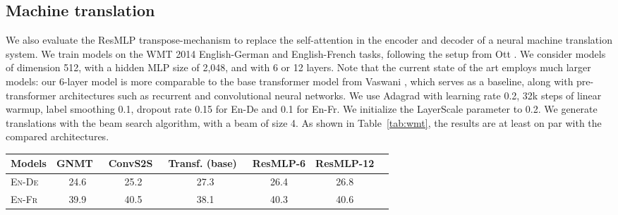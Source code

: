 \subsection{Machine translation}



We also evaluate the ResMLP transpose-mechanism to replace the self-attention in the encoder and decoder of a neural machine translation system.
We train models on the WMT 2014 English-German and English-French tasks, following the setup from Ott \etal \cite{ott2018scaling}.
We consider models of dimension 512, with a hidden MLP size of 2,048, and with 6 or 12 layers. Note that the current state of the art employs much larger models: our 6-layer model is more comparable to the base transformer model from Vaswani \etal \cite{vaswani2017attention}, which serves as a baseline, along with pre-transformer architectures such as recurrent and convolutional neural networks. 
We use Adagrad with learning rate 0.2, 32k steps of linear warmup, label smoothing 0.1, dropout rate 0.15 for En-De and 0.1 for En-Fr.
We initialize the LayerScale parameter to 0.2. We generate translations with the beam search algorithm, with a beam of size 4.
As shown in Table~\ref{tab:wmt}, the results are at least on par with the compared architectures. 

\begin{table}[h]
    \def \mysp {\hspace{6pt}}
     \centering \scalebox{0.9}
    {
    \begin{tabular}{lcccccc}
    \toprule
    Models &  GNMT~\cite{wu2016google} & ConvS2S~\cite{gehring2017convolutional} & Transf. (base)~\cite{vaswani2017attention} &  ResMLP-6 & ResMLP-12 &    \\
    \midrule
    \textsc{En-De} & 24.6 & 25.2 &  27.3  & 26.4 & 26.8  &  \\
    \textsc{En-Fr} & 39.9 & 40.5 &  38.1  & 40.3 & 40.6  &  \\
    \bottomrule
    \end{tabular}}
\end{table}